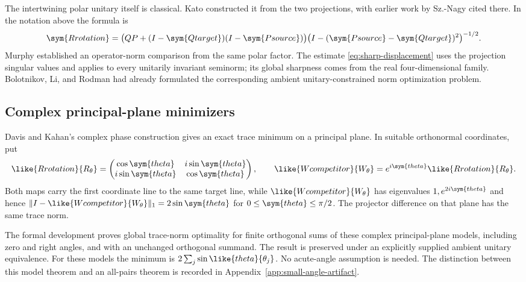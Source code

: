 The intertwining polar unitary itself is classical. Kato
\citep[Chapter~I, \S4.6, equations~(4.33)--(4.42)]{kato1966perturbation}
constructed it from the two projections, with earlier work by
Sz.-Nagy cited there. In the notation above the formula is
\[
 \sym{Rrotation}=\bigl(QP+(I-\sym{Qtarget})(I-\sym{Psource})\bigr)\bigl(I-(\sym{Psource}-\sym{Qtarget})^2\bigr)^{-1/2}.
\]
Murphy \citep[Lemma~6.2.1, p.~178]{murphy1990operator} established an
operator-norm comparison from the same polar factor. The estimate
\cref{eq:sharp-displacement} uses the projection singular values and
applies to every unitarily invariant seminorm; its global sharpness
comes from the real four-dimensional family. Bolotnikov, Li, and Rodman
\citep[Problem~1.1]{bolotnikov2001minimal} had already formulated the
corresponding ambient unitary-constrained norm optimization problem.

\subsection{Complex principal-plane minimizers}
\label{sec:complex-trace-model}

Davis and Kahan's complex phase construction
\citep[Example~4.2]{davis1970rotation} gives an exact trace minimum on
a principal plane. In suitable orthonormal coordinates, put
\begin{equation}
 \like{Rrotation}{R_\theta}=\begin{pmatrix}\cos\sym{theta}&i\sin\sym{theta}\\
                    i\sin\sym{theta}&\cos\sym{theta}\end{pmatrix},
 \qquad \like{Wcompetitor}{W_\theta}=e^{i\sym{theta}}\like{Rrotation}{R_\theta}.
 \label{eq:complex-phase}
\end{equation}
Both maps carry the first coordinate line to the same target line, while
$\like{Wcompetitor}{W_\theta}$ has eigenvalues $1,e^{2i\sym{theta}}$ and hence
$\|I-\like{Wcompetitor}{W_\theta}\|_1=2\sin\sym{theta}$ for $0\leq\sym{theta}\leq\pi/2$.
The projector difference on that plane has the same trace norm.

The formal development proves global trace-norm optimality for finite
orthogonal sums of these complex principal-plane models, including zero
and right angles, and with an unchanged orthogonal summand. The result is
preserved under an explicitly supplied ambient unitary equivalence.
For these models the minimum is $2\sum_j\sin\like{theta}{\theta_j}$. No acute-angle
assumption is needed. The distinction between this model theorem and an
all-pairs theorem is recorded in Appendix~\ref{app:small-angle-artifact}.


